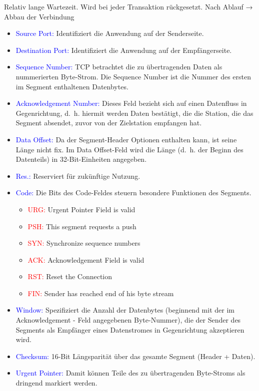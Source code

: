 Relativ lange Wartezeit.
Wird bei jeder Transaktion rückgesetzt.
Nach Ablauf → Abbau der Verbindung

\begin{itemize}
    \item \textcolor{blue}{Source Port:} Identifiziert die Anwendung auf der Senderseite.
    \item \textcolor{blue}{Destination Port:} Identifiziert die Anwendung auf der Empfängerseite.
    \item \textcolor{blue}{Sequence Number:} TCP betrachtet die zu übertragenden Daten als nummerierten Byte-Strom.
    Die Sequence Number ist die Nummer des ersten im Segment enthaltenen Datenbytes.
    \item \textcolor{blue}{Acknowledgement Number:} Dieses Feld bezieht sich auf einen Datenfluss in Gegenrichtung, d.\ h. hiermit werden Daten bestätigt, die die Station, die das Segment absendet, zuvor von der Zielstation empfangen hat.
    \item \textcolor{blue}{Data Offset:} Da der Segment-Header Optionen enthalten kann, ist seine Länge nicht fix.
    Im Data Offset-Feld wird die Länge (d.\ h. der Beginn des Datenteils) in 32-Bit-Einheiten angegeben.
    \item \textcolor{blue}{Res.:} Reserviert für zukünftige Nutzung.
    \item \textcolor{blue}{Code:} Die Bits des Code-Feldes steuern besondere Funktionen des Segments.
    \begin{itemize}
        \item \textcolor{red}{URG:} Urgent Pointer Field is valid
        \item \textcolor{red}{PSH:} This segment requests a push
        \item \textcolor{red}{SYN:} Synchronize sequence numbers
        \item \textcolor{red}{ACK:} Acknowledgement Field is valid
        \item \textcolor{red}{RST:} Reset the Connection
        \item \textcolor{red}{FIN:} Sender has reached end of his byte stream
    \end{itemize}
    \item \textcolor{blue}{Window:} Spezifiziert die Anzahl der Datenbytes (beginnend mit der im Acknowledgement - Feld angegebenen Byte-Nummer), die der Sender des Segments als Empfänger eines Datenstromes in Gegenrichtung akzeptieren wird.
    \item \textcolor{blue}{Checksum:} 16-Bit Längsparität über das gesamte Segment (Header + Daten).
    \item \textcolor{blue}{Urgent Pointer:} Damit können Teile des zu übertragenden Byte-Stroms als dringend markiert werden.
\end{itemize}

